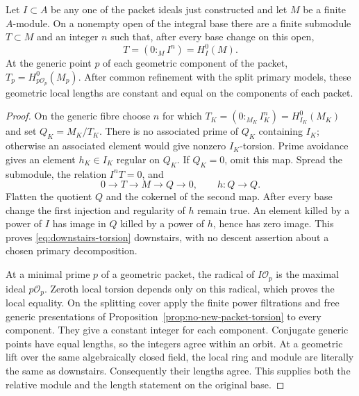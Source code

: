 \begin{proposition}
\label{prop:descended-packet-torsion}
Let \(I\subset A\) be any one of the packet ideals just constructed
and let \(M\) be a finite \(A\)-module.  On a nonempty open of
the integral base there are a finite submodule \(T\subset M\)
and an integer \(n\) such that, after every base change on this
open,
\begin{equation}\label{eq:downstairs-torsion}
 T=(0:_M I^n)=H^0_I(M).
\end{equation}
At the generic point \(p\) of each geometric component of the
packet, \(T_p=H^0_{p\mathcal O_p}(M_p)\).  After common
refinement with the split primary models, these geometric local
lengths are constant and equal on the components of each packet.
\end{proposition}
\begin{proof}
On the generic fibre choose \(n\) for which
\(T_K=(0:_{M_K}I_K^n)=H^0_{I_K}(M_K)\) and set
\(Q_K=M_K/T_K\).  There is no associated prime of \(Q_K\)
containing \(I_K\); otherwise an associated element would give
nonzero \(I_K\)-torsion.  Prime avoidance gives an element
\(h_K\in I_K\) regular on \(Q_K\).  If \(Q_K=0\), omit
this map.  Spread the submodule, the relation \(I^nT=0\), and
\[
 0\to T\to M\to Q\to0,\qquad h:Q\longrightarrow Q.
\]
Flatten the quotient \(Q\) and the cokernel of the second map.
After every base change the first injection and regularity of \(h\)
remain true.  An element killed by a power of \(I\) has image in
\(Q\) killed by a power of \(h\), hence has zero image.  This
proves \eqref{eq:downstairs-torsion} downstairs, with no descent
assertion about a chosen primary decomposition.

At a minimal prime \(p\) of a geometric packet, the radical of
\(I\mathcal O_p\) is the maximal ideal \(p\mathcal O_p\).
Zeroth local torsion depends only on this radical, which proves the
local equality.  On the splitting cover apply the finite power
filtrations and free generic presentations of
Proposition~\ref{prop:no-new-packet-torsion} to every component.
They give a constant integer for each component.  Conjugate generic
points have equal lengths, so the integers agree within an orbit.
At a geometric lift over the same algebraically closed field, the
local ring and module are literally the same as downstairs.
Consequently their lengths agree.  This supplies both the relative
module and the length statement on the original base.
\end{proof}
